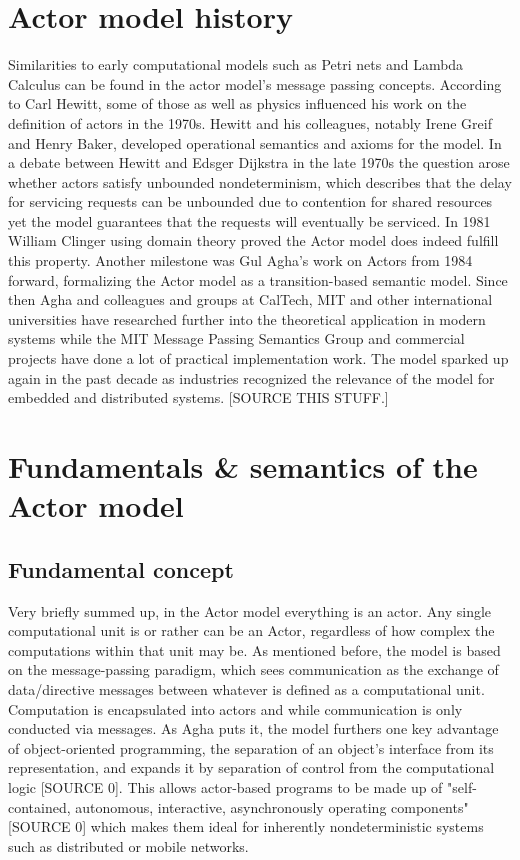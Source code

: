 \documentclass[A4]{article}
\begin{document}
\section{Actor model history}
Similarities to early computational models such as Petri nets and Lambda Calculus can be found in the actor model's message passing concepts. According to Carl Hewitt, some of those as well as physics influenced his work on the definition of actors in the 1970s. Hewitt and his colleagues, notably Irene Greif and Henry Baker, developed operational semantics and axioms for the model. In a debate between Hewitt and Edsger Dijkstra in the late 1970s the question arose whether actors satisfy unbounded nondeterminism, which describes that the delay for servicing requests can be unbounded due to contention for shared resources yet the model guarantees that the requests will eventually be serviced. In 1981 William Clinger using domain theory proved the Actor model does indeed fulfill this property. Another milestone was Gul Agha's work on Actors from 1984 forward, formalizing the Actor model as a transition-based semantic model.
Since then Agha and colleagues and groups at CalTech, MIT and other international universities have researched further into the theoretical application in modern systems while the MIT Message Passing Semantics Group and commercial projects have done a lot of practical implementation work. The model sparked up again in the past decade as industries recognized the relevance of the model for embedded and distributed systems. [SOURCE THIS STUFF.]

\section{Fundamentals \& semantics of the Actor model}
\subsection{Fundamental concept}
Very briefly summed up, in the Actor model everything is an actor. Any single computational unit is or rather can be an Actor, regardless of how complex the computations within that unit may be. 
As mentioned before, the model is based on the message-passing paradigm, which sees communication as the exchange of data/directive messages between whatever is defined as a computational unit. Computation is encapsulated into actors and while communication is only conducted via messages. As Agha puts it, the model furthers one key advantage of object-oriented programming, the separation of an object's interface from its representation, and expands it by separation of control from the computational logic [SOURCE 0]. This allows actor-based programs to be made up of "self-contained, autonomous, interactive, asynchronously operating components" [SOURCE 0] which makes them ideal for inherently nondeterministic systems such as distributed or mobile networks. 
\end{document}
